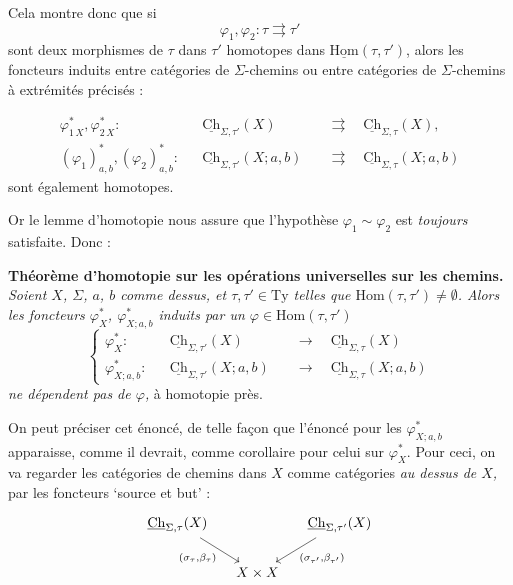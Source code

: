 \documentclass[11pt]{article}
\newcommand{\printedpage}[1]{\marginpar{\footnotesize p.~#1}}
\newcommand{\msp}[1]{\marginpar{\footnotesize [#1]}}
\newcommand{\uHom}{\underline{\mathrm{Hom}}}
\newcommand{\uCh}{\underline{\mathrm{Ch}}}
\begin{document}
Cela montre donc que si
\[
\varphi_1,\varphi_2:\tau\rightrightarrows\tau'
\]
sont deux morphismes de $\tau$ dans $\tau'$ homotopes dans $\uHom(\tau,\tau')$, alors les foncteurs induits entre catégories de $\Sigma$-chemins ou entre catégories de $\Sigma$-chemins à extrémités précisés : %

\msp{page 97}
\[
\begin{aligned}
\varphi^*_{1\,X},\varphi^*_{2\,X} : && \uCh_{\Sigma,\tau'}(X) &\quad\rightrightarrows\quad\uCh_{\Sigma,\tau}(X),\\
(\varphi_1)^*_{a,b},(\varphi_2)^*_{a,b} : && \uCh_{\Sigma,\tau'}(X;a,b) &\quad\rightrightarrows\quad\uCh_{\Sigma,\tau}(X;a,b)
\end{aligned}
\]
sont également homotopes.

Or le lemme d'homotopie nous assure que l'hypothèse $\varphi_1\sim\varphi_2$ est \textit{toujours} satisfaite. Donc :

\textbf{Théorème d'homotopie sur les opérations universelles sur les chemins.} \textit{Soient $X$, $\Sigma$, $a$, $b$ comme dessus, et $\tau,\tau'\in\mathrm{Ty}$ telles que $\mathrm{Hom}(\tau,\tau')\neq\emptyset$. Alors les foncteurs $\varphi^*_X$, $\varphi^*_{X;a,b}$ induits par un $\varphi\in\mathrm{Hom}(\tau,\tau')$}
\[
\left\{
\begin{aligned}
\varphi^*_X : && \uCh_{\Sigma,\tau'}(X) &\quad\longrightarrow\quad\uCh_{\Sigma,\tau}(X)\\
\varphi^*_{X;a,b} : && \uCh_{\Sigma,\tau'}(X;a,b) &\quad\longrightarrow\quad\uCh_{\Sigma,\tau}(X;a,b)
\end{aligned}
\right.
\]
\textit{ne dépendent pas de $\varphi$,} à homotopie près.

On peut préciser cet énoncé, de telle façon que l'énoncé pour les $\varphi^*_{X;a,b}$ apparaisse, comme il devrait, comme corollaire pour celui sur $\varphi^*_X$. Pour ceci, on va regarder les catégories de chemins dans $X$ comme catégories \textit{au dessus de $X$,} par les foncteurs `source et but' :
\[
\begin{tikzcd}[column sep=small]
\uCh_{\Sigma,\tau}(X) \arrow[dr, "(\sigma_\tau{,}\beta_\tau)"'] & & \uCh_{\Sigma,\tau'}(X) \arrow[dl, "(\sigma_{\tau'}{,}\beta_{\tau'})"]\\
 & X\times X &
\end{tikzcd}
\]

\newpage
\printedpage{63}

\msp{page 98}
\end{document}
